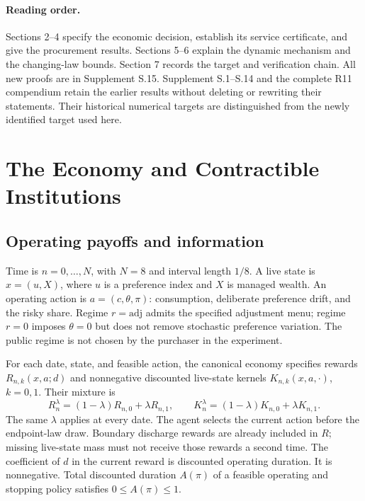 \paragraph{Reading order.} Sections 2--4 specify the economic decision, establish its service certificate, and give the procurement results. Sections 5--6 explain the dynamic mechanism and the changing-law bounds. Section 7 records the target and verification chain. All new proofs are in Supplement S.15. Supplement S.1--S.14 and the complete R11 compendium retain the earlier results without deleting or rewriting their statements. Their historical numerical targets are distinguished from the newly identified target used here.

\section{The Economy and Contractible Institutions}
\label{sec:r12_economy}
\subsection{Operating payoffs and information}
Time is $n=0,\ldots,N$, with $N=8$ and interval length $1/8$. A live state is $x=(u,X)$, where $u$ is a preference index and $X$ is managed wealth. An operating action is $a=(c,\theta,\pi)$: consumption, deliberate preference drift, and the risky share. Regime $r=\mathrm{adj}$ admits the specified adjustment menu; regime $r=0$ imposes $\theta=0$ but does not remove stochastic preference variation. The public regime is not chosen by the purchaser in the experiment.

For each date, state, and feasible action, the canonical economy specifies rewards $R_{n,k}(x,a;d)$ and nonnegative discounted live-state kernels $K_{n,k}(x,a,\cdot)$, $k=0,1$. Their mixture is
\begin{equation}
 R_n^\lambda=(1-\lambda)R_{n,0}+\lambda R_{n,1},\qquad
 K_n^\lambda=(1-\lambda)K_{n,0}+\lambda K_{n,1}.
 \label{eq:r12_mixture}
\end{equation}
The same $\lambda$ applies at every date. The agent selects the current action before the endpoint-law draw. Boundary discharge rewards are already included in $R$; missing live-state mass must not receive those rewards a second time. The coefficient of $d$ in the current reward is discounted operating duration. It is nonnegative. Total discounted duration $A(\pi)$ of a feasible operating and stopping policy satisfies $0\leq A(\pi)\leq1$.

